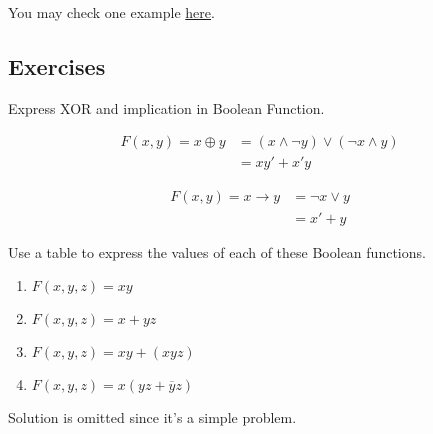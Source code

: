 	\begin{example}
		You may check one example \href{https://www.tutorialspoint.com/digital_circuits/digital_circuits_quine_mccluskey_tabular_method.htm}{here}.
	\end{example}
	
	
    \subsection{Exercises}
    \begin{exercise}
        Express XOR and implication in Boolean Function.
    \end{exercise}
    \begin{solution}
        \begin{align*}
            F(x,y)= x \oplus y &= (x \land \lnot y) \lor (\lnot x \land y)\\
                       &= xy' + x'y
            \end{align*}

            \begin{align*}
                F(x,y)= x \rightarrow y &= \lnot x \lor y\\
                                &= x' + y
                \end{align*}
    \end{solution}

    \begin{exercise}
        Use a table to express the values of each of these Boolean functions.
        \begin{enumerate}[label=\alph*)]
            \item $F(x, y, z) = xy$
            \item $F(x, y, z) = x + yz$
            \item $F(x, y, z) = xy + (xyz)$
            \item $F(x, y, z) = x(yz + \overline{y}z)$
        \end{enumerate}
            Solution is omitted since it's a simple problem.
    \end{exercise}

